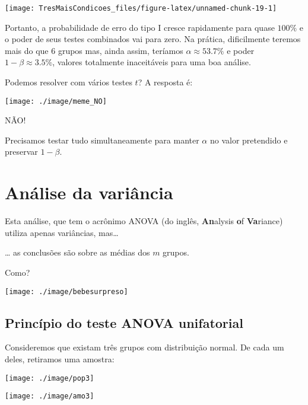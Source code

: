 \documentclass[]{article}
\begin{document}
\begin{center}\texttt{[image: TresMaisCondicoes\_files/figure-latex/unnamed-chunk-19-1]} \end{center}

Portanto, a probabilidade de erro do tipo I cresce rapidamente para
quase \(100\%\) e o poder de seus testes combinados vai para zero. Na
prática, dificilmente teremos mais do que 6 grupos mas, ainda assim,
teríamos \(\alpha \approx 53.7\%\) e poder \(1-\beta \approx 3.5\%\),
valores totalmente inaceitáveis para uma boa análise.

 Podemos resolver com vários testes \(t\)? A resposta é:

\begin{center}\texttt{[image: ./image/meme\_NO]} \end{center}

NÃO!

Precisamos testar tudo simultaneamente para manter \(\alpha\) no valor
pretendido e preservar \(1-\beta\).

\section{Análise da variância}\label{analise-da-variancia}

Esta análise, que tem o acrônimo ANOVA (do inglês, \textbf{An}alysis
\textbf{o}f \textbf{Va}riance) utiliza apenas variâncias, mas\ldots{}

 \ldots{} as conclusões são sobre as médias dos \(m\) grupos.

Como?

\begin{center}\texttt{[image: ./image/bebesurpreso]} \end{center}

\subsection{Princípio do teste ANOVA
unifatorial}\label{principio-do-teste-anova-unifatorial}

Consideremos que existam três grupos com distribuição normal. De cada um
deles, retiramos uma amostra:

\begin{center}\texttt{[image: ./image/pop3]} \end{center}

\begin{center}\texttt{[image: ./image/amo3]} \end{center}
\end{document}
